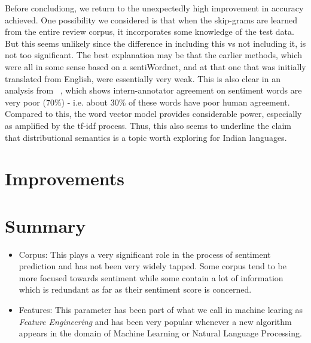 Before concludiong, we return to the unexpectedly high improvement in accuracy achieved. One possibility we considered is that when the skip-grams are learned from the entire review corpus, it incorporates some knowledge of the test data.  But this seems unlikely since the difference in including this vs not including it, is not too significant.  The best explanation may be that the earlier methods, which were all in some sense based on a sentiWordnet, and at that one that was initially translated from English, were essentially very weak.  This is also clear in an analysis from
~\cite{Bakliwal:12}, which shows intern-annotator agreement on sentiment words are very poor (70\%) - i.e. about 30\% of these words have poor human agreement. Compared to this, the word vector model  
provides considerable power, especially as amplified by the tf-idf process. Thus, this also seems to underline the claim that distributional semantics is a topic worth exploring for Indian languages. 

\section{Improvements}
	
\section{Summary}
\begin{itemize}
	\item Corpus: This plays a very significant role in the process of sentiment prediction and has not been very widely tapped. Some corpus tend to be more focused towards sentiment while some contain a lot of information which is redundant as far as their sentiment score is concerned.
	\item Features: This parameter has been part of what we call in machine learing as \emph{Feature Engineering} and has been very popular whenever a new algorithm appears in the domain of Machine Learning or Natural Language Processing.
\end{itemize}
